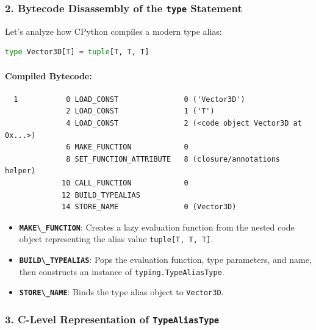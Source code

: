 \hypertarget{bytecode-disassembly-of-the-type-statement}{%
\subsubsection{\texorpdfstring{2. Bytecode Disassembly of the
\texttt{type}
Statement}{2. Bytecode Disassembly of the type Statement}}\label{bytecode-disassembly-of-the-type-statement}}

Let's analyze how CPython compiles a modern type alias:

\begin{lstlisting}[language=Python]
type Vector3D[T] = tuple[T, T, T]
\end{lstlisting}

\hypertarget{compiled-bytecode}{%
\paragraph{Compiled Bytecode:}\label{compiled-bytecode}}

\begin{lstlisting}
  1           0 LOAD_CONST               0 ('Vector3D')
              2 LOAD_CONST               1 ('T')
              4 LOAD_CONST               2 (<code object Vector3D at 0x...>)
              6 MAKE_FUNCTION            0
              8 SET_FUNCTION_ATTRIBUTE   8 (closure/annotations helper)
             10 CALL_FUNCTION            0
             12 BUILD_TYPEALIAS
             14 STORE_NAME               0 (Vector3D)
\end{lstlisting}

\begin{itemize}
\tightlist
\item
  \textbf{\passthrough{\lstinline!MAKE\_FUNCTION!}}: Creates a lazy
  evaluation function from the nested code object representing the alias
  value \passthrough{\lstinline!tuple[T, T, T]!}.
\item
  \textbf{\passthrough{\lstinline!BUILD\_TYPEALIAS!}}: Pops the
  evaluation function, type parameters, and name, then constructs an
  instance of \passthrough{\lstinline!typing.TypeAliasType!}.
\item
  \textbf{\passthrough{\lstinline!STORE\_NAME!}}: Binds the type alias
  object to \passthrough{\lstinline!Vector3D!}.
\end{itemize}

\hypertarget{c-level-representation-of-typealiastype}{%
\subsubsection{\texorpdfstring{3. C-Level Representation of
\texttt{TypeAliasType}}{3. C-Level Representation of TypeAliasType}}\label{c-level-representation-of-typealiastype}}

